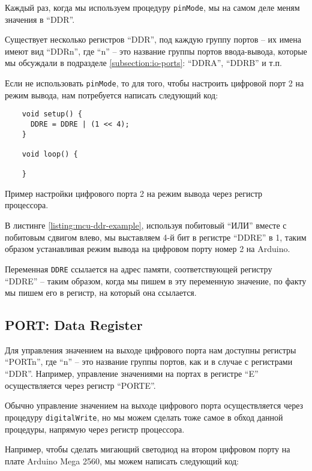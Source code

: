 \documentclass[../sparc.tex]{subfiles}
\begin{document}
Каждый раз, когда мы используем процедуру \texttt{pinMode}, мы на самом
деле меням значения в ``DDR''.

Существует несколько регистров ``DDR'', под каждую группу портов -- их имена
имеют вид ``DDRn'', где ``n'' -- это название группы портов ввода-вывода, которые
мы обсуждали в подразделе \ref{subsection:io-ports}: ``DDRA'', ``DDRB'' и т.п.

Если не использовать \texttt{pinMode}, то для того, чтобы настроить
цифровой порт 2 на режим вывода, нам потребуется написать следующий код:

\begin{listing}[H]
  \begin{verbatim}
    void setup() {
      DDRE = DDRE | (1 << 4);
    }

    void loop() {

    }
  \end{verbatim}
  \caption{Пример настройки цифрового порта 2 на режим вывода через регистр
    процессора.}
  \label{listing:mcu-ddr-example}
\end{listing}

В листинге \ref{listing:mcu-ddr-example}, используя побитовый ``ИЛИ'' вместе с
побитовым сдвигом влево, мы выставляем 4-й бит в регистре ``DDRE'' в 1, таким
образом устанавливая режим вывода на цифровом порту номер 2 на Arduino.

Переменная \texttt{DDRE} ссылается на адрес памяти, соответствующей
регистру ``DDRE'' -- таким образом, когда мы пишем в эту переменную значение, по
факту мы пишем его в регистр, на который она ссылается.

\subsection{PORT: Data Register}

Для управления значением на выходе цифрового порта нам доступны регистры
``PORTn'', где ``n'' -- это название группы портов, как и в случае с регистрами
``DDR''.  Например, управление значениями на портах в регистре ``E''
осуществляется через регистр ``PORTE''.

Обычно управление значением на выходе цифрового порта осуществляется через
процедуру \texttt{digitalWrite}, но мы можем сделать тоже самое в обход
данной процедуры, напрямую через регистр процессора.

Например, чтобы сделать мигающий светодиод на втором цифровом порту на плате
Arduino Mega 2560, мы можем написать следующий код:
\end{document}
